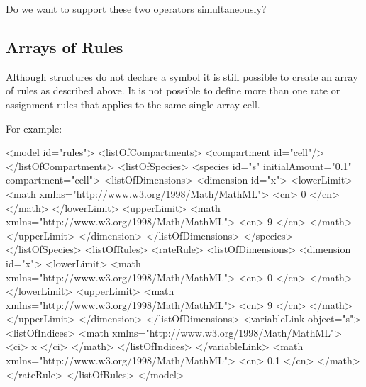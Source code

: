 \documentclass{cekarticle}
\begin{document}
Do we want to support these two operators simultaneously? 

\subsection{Arrays of Rules}

Although  structures do not declare a symbol it is still possible to
create an array of rules as described above.  
It is not possible to define more than one rate or assignment rules that applies
to the same single array cell.

For example:

\begin{example}
<model id="rules">
    <listOfCompartments>
        <compartment id="cell"/>
    </listOfCompartments>
    <listOfSpecies>
        <species id="s" initialAmount="0.1" compartment="cell">
            <listOfDimensions>
                <dimension id="x">
                    <lowerLimit>
                        <math xmlns="http://www.w3.org/1998/Math/MathML">
                            <cn> 0 </cn>
                        </math>
                    </lowerLimit>
                    <upperLimit>
                        <math xmlns="http://www.w3.org/1998/Math/MathML">
                            <cn> 9 </cn>
                        </math>
                    </upperLimit>
                </dimension>
            </listOfDimensions>
        </species>
    </listOfSpecies>
    <listOfRules>
        <rateRule>
            <listOfDimensions>
                <dimension id="x">
                    <lowerLimit>
                        <math xmlns="http://www.w3.org/1998/Math/MathML">
                            <cn> 0 </cn>
                        </math>
                    </lowerLimit>
                    <upperLimit>
                        <math xmlns="http://www.w3.org/1998/Math/MathML">
                            <cn> 9 </cn>
                        </math>
                    </upperLimit>
                </dimension>
            </listOfDimensions>
            <variableLink object="s">
                <listOfIndices>
                    <math xmlns="http://www.w3.org/1998/Math/MathML">
                        <ci> x </ci>
                    </math>          
                </listOfIndices>
            </variableLink>
            <math xmlns="http://www.w3.org/1998/Math/MathML">
                <cn> 0.1 </cn>
            </math>
        </rateRule>
    </listOfRules>
</model>
\end{example}
\end{document}
